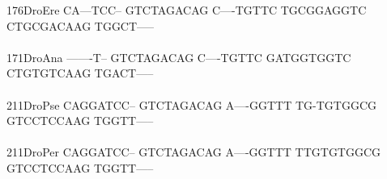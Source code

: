 \documentclass[11pt,twoside,reqno,a4paper]{article}
\begin{document}
{176\hspace*{1\charwidth}DroEre	CA---TCC--	GTCTAGACAG	C----TGTTC	TGCGGAGGTC	CTGCGACAAG	TGGCT-----	\\
\hspace*{4\charwidth}\hspace*{7\charwidth}\hspace*{1\charwidth}\hspace*{1\charwidth}\hspace*{1\charwidth}\hspace*{1\charwidth}\hspace*{1\charwidth}\hspace*{1\charwidth}\\
171\hspace*{1\charwidth}DroAna	-------T--	GTCTAGACAG	C----TGTTC	GATGGTGGTC	CTGTGTCAAG	TGACT-----	\\
\hspace*{4\charwidth}\hspace*{7\charwidth}\hspace*{1\charwidth}\hspace*{1\charwidth}\hspace*{1\charwidth}\hspace*{1\charwidth}\hspace*{1\charwidth}\hspace*{1\charwidth}\\
211\hspace*{1\charwidth}DroPse	CAGGATCC--	GTCTAGACAG	A----GGTTT	TG-TGTGGCG	GTCCTCCAAG	TGGTT-----	\\
\hspace*{4\charwidth}\hspace*{7\charwidth}\hspace*{1\charwidth}\hspace*{1\charwidth}\hspace*{1\charwidth}\hspace*{1\charwidth}\hspace*{1\charwidth}\hspace*{1\charwidth}\\
211\hspace*{1\charwidth}DroPer	CAGGATCC--	GTCTAGACAG	A----GGTTT	TTGTGTGGCG	GTCCTCCAAG	TGGTT-----	\\
\hspace*{4\charwidth}\hspace*{7\charwidth}\hspace*{1\charwidth}\hspace*{1\charwidth}\hspace*{1\charwidth}\hspace*{1\charwidth}\hspace*{1\charwidth}\hspace*{1\charwidth}\\
}
\end{document}

